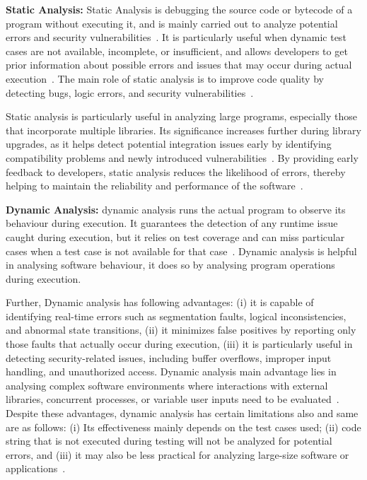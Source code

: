 \textbf{Static Analysis:} Static Analysis is debugging the source code or bytecode of a program
without executing it, and is mainly carried out to analyze potential errors and security
vulnerabilities~\cite{Kuszczyński2023}. It is particularly useful when dynamic test cases are not available,
incomplete, or insufficient, and allows developers to get prior information about possible
errors and issues that may occur during actual execution~\cite{Rahaman2023}. The main role of static
analysis is to improve code quality by detecting bugs, logic errors, and security
vulnerabilities~\cite{Ashwin2024}.

Static analysis is particularly useful in analyzing large programs, especially those that
incorporate multiple libraries. Its significance increases further during library upgrades,
as it helps detect potential integration issues early by identifying compatibility problems
and newly introduced vulnerabilities~\cite{Admiraal2024}. By providing early feedback to developers,
static analysis reduces the likelihood of errors, thereby helping to maintain the reliability
and performance of the software~\cite{Haonan2024}.

\textbf{Dynamic Analysis:} dynamic analysis runs the actual program to observe its
behaviour during execution. It guarantees the detection of any runtime issue caught
during execution, but it relies on test coverage and can miss particular cases when a test
case is not available for that case~\cite{Kuliamin2024}. Dynamic analysis is helpful in analysing software
behaviour, it does so by analysing program operations during execution.

Further, Dynamic analysis has following advantages: (i) it is capable of identifying
real-time errors such as segmentation faults, logical inconsistencies, and abnormal state
transitions, (ii) it minimizes false positives by reporting only those faults that actually
occur during execution, (iii) it is particularly useful in detecting security-related issues,
including buffer overflows, improper input handling, and unauthorized access. Dynamic
analysis main advantage lies in analysing complex software environments where
interactions with external libraries, concurrent processes, or variable user inputs need to
be evaluated~\cite{Sutter2024}. Despite these advantages, dynamic analysis has certain limitations
also and same are as follows: (i) Its effectiveness mainly depends on the test cases used;
(ii) code string that is not executed during testing will not be analyzed for potential
errors, and (iii) it may also be less practical for analyzing large-size software or
applications~\cite{Somi2024}.

